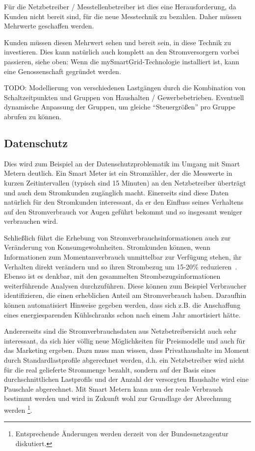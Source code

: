 \documentclass[12pt,BCOR=8.5mm]{scrartcl}
\begin{document}
Für die Netzbetreiber / Messtellenbetreiber ist dies eine
Herausforderung, da Kunden nicht bereit sind, für die neue Messtechnik
zu bezahlen. Daher müssen Mehrwerte geschaffen werden.

Kunden müssen diesen Mehrwert sehen und bereit sein, in diese Technik zu
investieren. Dies kann natürlich auch komplett an den Stromversorgern
vorbei passieren, siehe oben: Wenn die mySmartGrid-Technologie
installiert ist, kann eine Genossenschaft gegründet werden.

TODO: Modellierung von verschiedenen Lastgängen durch die Kombination
von Schaltzeitpunkten und Gruppen von Haushalten / Gewerbebetrieben.
Eventuell dynamische Anpassung der Gruppen, um gleiche ``Steuergrößen''
pro Gruppe abrufen zu können. 




\subsection{Datenschutz}\label{sub:datenschutz}

Dies wird zum Beispiel an der Datenschutzproblematik im Umgang mit Smart
Metern deutlich. Ein Smart Meter ist ein Stromzähler, der die Messwerte
in kurzen Zeitintervallen (typisch sind 15 Minuten) an den Netzbetreiber
überträgt und auch dem Stromkunden zugänglich macht. Einerseits sind
diese Daten natürlich für den Stromkunden interessant, da er den
Einfluss seines Verhaltens auf den Stromverbrauch vor Augen geführt
bekommt und so insgesamt weniger verbrauchen wird.

Schließlich führt die Erhebung von Stromverbrauchsinformationen auch zur
Veränderung von Konsumgewohnheiten. Stromkunden können, wenn
Informationen zum Momentanverbrauch unmittelbar zur Verfügung stehen,
ihr Verhalten direkt verändern und so ihren Strombezug um 15-20\%
reduzieren~\cite{geller2010smartgrid}. Ebenso ist es denkbar, mit den
gesammelten Strombezugsinformationen weiterführende Analysen
durchzuführen. Diese können zum Beispiel Verbraucher identifizieren, die
einen erheblichen Anteil am Stromverbrauch haben. Daraufhin können
automatisiert Hinweise gegeben werden, dass sich z.B. die Anschaffung
eines energiesparenden Kühlschranks schon nach einem Jahr amortisiert
hätte.




Andererseits sind die Stromverbrauchsdaten aus Netzbetreibersicht auch
sehr interessant, da sich hier völlig neue Möglichkeiten für
Preismodelle und auch für das Marketing ergeben. Dazu muss man wissen,
dass Privathaushalte im Moment durch Standardlastprofile abgerechnet
werden, d.h. ein Netzbetreiber wird nicht für die real gelieferte
Strommenge bezahlt, sondern auf der Basis eines durchschnittlichen
Lastprofils und der Anzahl der versorgten Haushalte wird eine Pauschale
abgerechnet. Mit Smart Metern kann nun der reale Verbrauch bestimmt
werden und wird in Zukunft wohl zur Grundlage der Abrechnung werden
\footnote{Entsprechende Änderungen werden derzeit von der
Bundesnetzagentur diskutiert.}. 
\end{document}
